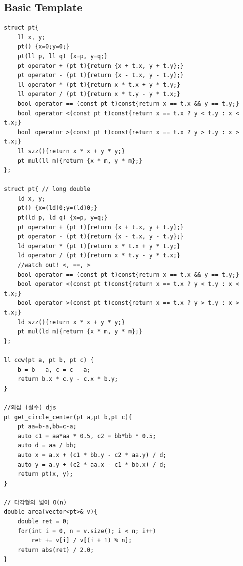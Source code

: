 \documentclass[landscape, 8pt, a4paper, oneside, twocolumn]{extarticle}
\begin{document}
\subsection{Basic Template}
\begin{verbatim}
struct pt{    
    ll x, y;
    pt() {x=0;y=0;}
    pt(ll p, ll q) {x=p, y=q;}
    pt operator + (pt t){return {x + t.x, y + t.y};}
    pt operator - (pt t){return {x - t.x, y - t.y};}
    ll operator * (pt t){return x * t.x + y * t.y;}
    ll operator / (pt t){return x * t.y - y * t.x;}
    bool operator == (const pt t)const{return x == t.x && y == t.y;}
    bool operator <(const pt t)const{return x == t.x ? y < t.y : x < t.x;}
    bool operator >(const pt t)const{return x == t.x ? y > t.y : x > t.x;}
    ll szz(){return x * x + y * y;}    
    pt mul(ll m){return {x * m, y * m};}
};

struct pt{ // long double
    ld x, y;
    pt() {x=(ld)0;y=(ld)0;}
    pt(ld p, ld q) {x=p, y=q;}
    pt operator + (pt t){return {x + t.x, y + t.y};}
    pt operator - (pt t){return {x - t.x, y - t.y};}
    ld operator * (pt t){return x * t.x + y * t.y;}
    ld operator / (pt t){return x * t.y - y * t.x;}
    //watch out! <, ==, >
    bool operator == (const pt t)const{return x == t.x && y == t.y;}
    bool operator <(const pt t)const{return x == t.x ? y < t.y : x < t.x;}
    bool operator >(const pt t)const{return x == t.x ? y > t.y : x > t.x;}
    ld szz(){return x * x + y * y;}    
    pt mul(ld m){return {x * m, y * m};}
};

ll ccw(pt a, pt b, pt c) {
    b = b - a, c = c - a;
    return b.x * c.y - c.x * b.y;
}

//외심 (실수) djs
pt get_circle_center(pt a,pt b,pt c){
    pt aa=b-a,bb=c-a;
    auto c1 = aa*aa * 0.5, c2 = bb*bb * 0.5;
    auto d = aa / bb;
    auto x = a.x + (c1 * bb.y - c2 * aa.y) / d;
    auto y = a.y + (c2 * aa.x - c1 * bb.x) / d;
    return pt(x, y);
}

// 다각형의 넓이 O(n)
double area(vector<pt>& v){
    double ret = 0;
    for(int i = 0, n = v.size(); i < n; i++)
        ret += v[i] / v[(i + 1) % n];
    return abs(ret) / 2.0;
}

\end{verbatim}
\end{document}
